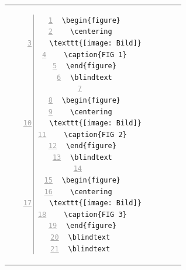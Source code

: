 \begin{table}[h!]
\begin{tabular}{c | c}
\begin{minipage}[m]{0.55\textwidth}
\begin{lstlisting}[numberstyle=\zebra{red!15}{green!15},numbers=left,basicstyle=\scriptsize]
\begin{figure}
  \centering  
  \texttt{[image: Bild]}
  \caption{FIG 1}
\end{figure}
\blindtext

\begin{figure}
  \centering  
  \texttt{[image: Bild]}
  \caption{FIG 2}
\end{figure}
\blindtext

\begin{figure}
  \centering  
  \texttt{[image: Bild]}
  \caption{FIG 3}
\end{figure}
\blindtext 
\blindtext 

\end{lstlisting}
\end{minipage}
\end{tabular}
\end{table}
